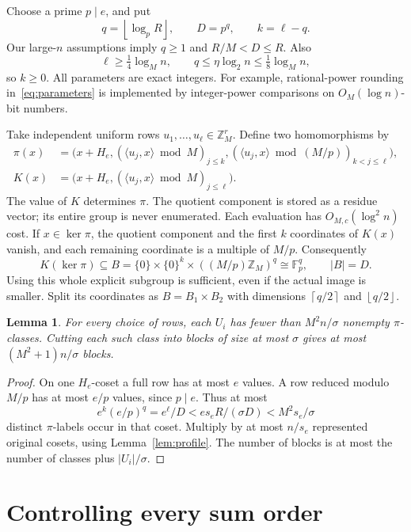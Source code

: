 \documentclass[acmsmall,11pt,nonacm,natbib=false]{acmart}
\newtheorem{lemma}[theorem]{Lemma}
\newcommand{\Z}{\mathbb Z}
\newcommand{\F}{\mathbb F}
\newcommand{\ceil}[1]{\left\lceil #1\right\rceil}
\newcommand{\floor}[1]{\left\lfloor #1\right\rfloor}
\begin{document}
Choose a prime $p\mid e$, and put
\[
 q=\floor{\log_p R},\qquad D=p^q,\qquad k=\ell-q.
\]
Our large-$n$ assumptions imply $q\ge1$ and $R/M<D\le R$. Also
\[
 \ell\ge\tfrac14\log_M n,\qquad
 q\le\eta\log_2 n\le\tfrac18\log_M n,
\]
so $k\ge0$. All parameters are exact integers. For example, rational-power
rounding in~\eqref{eq:parameters} is implemented by integer-power comparisons
on $O_M(\log n)$-bit numbers.

Take independent uniform rows $u_1,\ldots,u_\ell\in\Z_M^r$. Define two
homomorphisms by
\begin{align}
 \pi(x)&=\bigl(x+H_e,
 (\langle u_j,x\rangle\bmod M)_{j\le k},
 (\langle u_j,x\rangle\bmod (M/p))_{k<j\le\ell}\bigr),\label{eq:pi}\\
 K(x)&=\bigl(x+H_e,
 (\langle u_j,x\rangle\bmod M)_{j\le\ell}\bigr).\label{eq:K}
\end{align}
The value of $K$ determines $\pi$. The quotient component is stored as a
residue vector; its entire group is never enumerated. Each evaluation has
$O_{M,c}(\log^2 n)$ cost. If $x\in\ker\pi$, the quotient component and
the first $k$ coordinates of $K(x)$ vanish, and each remaining coordinate
is a multiple of $M/p$. Consequently
\begin{equation}\label{eq:B}
 K(\ker\pi)\subseteq
 B=\{0\}\times\{0\}^k\times((M/p)\Z_M)^q\cong\F_p^q,
 \qquad |B|=D.
\end{equation}
Using this whole explicit subgroup is sufficient, even if the actual image
is smaller. Split its coordinates as $B=B_1\times B_2$ with dimensions
$\ceil{q/2}$ and $\floor{q/2}$.

\begin{lemma}\label{lem:blocks}
For every choice of rows, each $U_i$ has fewer than $M^2n/\sigma$ nonempty
$\pi$-classes. Cutting each such class into blocks of size at most $\sigma$
gives at most $(M^2+1)n/\sigma$ blocks.
\end{lemma}
\begin{proof}
On one $H_e$-coset a full row has at most $e$ values. A row reduced modulo
$M/p$ has at most $e/p$ values, since $p\mid e$. Thus at most
\[
 e^k(e/p)^q=e^\ell/D
 < e s_e R/(\sigma D)<M^2s_e/\sigma
\]
distinct $\pi$-labels occur in that coset. Multiply by at most $n/s_e$
represented original cosets, using Lemma~\ref{lem:profile}. The number of
blocks is at most the number of classes plus $|U_i|/\sigma$.
\end{proof}

\section{Controlling every sum order}\label{sec:orders}
\end{document}
